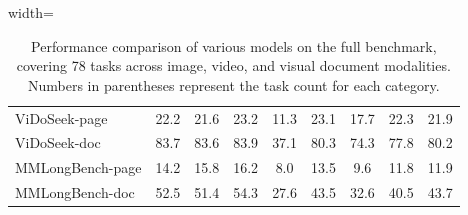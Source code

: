 \begin{table}[!ht]
\begin{adjustbox}{width=\textwidth}
\begin{tabular}{l|cccccccc}
        ViDoSeek-page & 22.2 & 21.6 & 23.2 & 11.3 & 23.1 & 17.7 & 22.3 & 21.9 \\ 
        ViDoSeek-doc & 83.7 & 83.6 & 83.9 & 37.1 & 80.3 & 74.3 & 77.8 & 80.2 \\ 
        MMLongBench-page & 14.2 & 15.8 & 16.2 & 8.0 & 13.5 & 9.6 & 11.8 &  11.9 \\
        MMLongBench-doc & 52.5 & 51.4 & 54.3 & 27.6 & 43.5 & 32.6 & 40.5 & 43.7 \\         
    \bottomrule
    \end{tabular}
    \end{adjustbox}
\caption{
Performance comparison of various models on the full \benchmark benchmark, covering 78 tasks across image, video, and visual document modalities. Numbers in parentheses represent the task count for each category.}
\label{tab:full_score}
\end{table}
